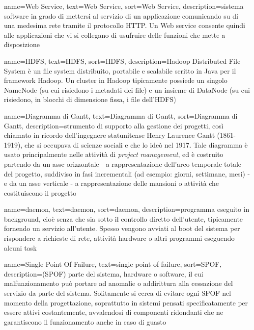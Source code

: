 {
	name=Web Service,
	text=Web Service,
	sort=Web Service,
	description={sistema software in grado di mettersi al servizio di un applicazione comunicando su di una medesima rete tramite il protocollo HTTP. Un Web service consente quindi alle applicazioni che vi si collegano di usufruire delle funzioni che mette a disposizione}
}

{
	name=HDFS,
	text=HDFS,
	sort=HDFS,
	description={Hadoop Distributed File System è un file system distribuito, portabile e scalabile scritto in Java per il framework Hadoop. Un cluster in Hadoop tipicamente possiede un singolo NameNode (su cui risiedono i metadati dei file) e un insieme di DataNode (su cui risiedono, in blocchi di dimensione fissa, i file dell'HDFS)}
}

{
	name=Diagramma di Gantt,
	text=Diagramma di Gantt,
	sort=Diagramma di Gantt,
	description={strumento di supporto alla gestione dei progetti, così chiamato in ricordo dell'ingegnere statunitense Henry Laurence Gantt (1861-1919), che si occupava di scienze sociali e che lo ideò nel 1917. Tale diagramma è usato principalmente nelle attività di \textit{project management}, ed è costruito partendo da un asse orizzontale - a rappresentazione dell'arco temporale totale del progetto, suddiviso in fasi incrementali (ad esempio: giorni, settimane, mesi) - e da un asse verticale - a rappresentazione delle mansioni o attività che costituiscono il progetto}
}

{
	name=daemon,
	text=daemon,
	sort=daemon,
	description={programma eseguito in background, cioè senza che sia sotto il controllo diretto dell'utente, tipicamente fornendo un servizio all'utente. Spesso vengono avviati al boot del sistema per rispondere a richieste di rete, attività hardware o altri programmi eseguendo alcuni task}
}

{
	name=Single Point Of Failure,
	text=single point of failure,
	sort=SPOF,
	description={(SPOF) parte del sistema, hardware o software, il cui malfunzionamento può portare ad anomalie o addirittura alla cessazione del servizio da parte del sistema.
	Solitamente si cerca di evitare ogni SPOF nel momento della progettazione, soprattutto in sistemi pensati specificatamente per essere attivi costantemente, avvalendosi di componenti ridondanti che ne garantiscono il funzionamento anche in caso di guasto}
}
